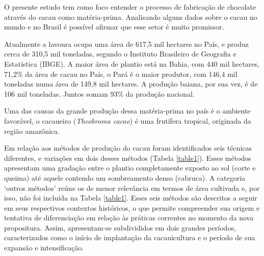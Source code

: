 \documentclass[
	12pt,				%
	openright,			%
	oneside,			%
	a4paper,			%
	english,			%
	french,				%
	spanish,			%
	brazil				%
	]{abntex2}
\begin{document}
O presente estudo tem como foco entender o processo de fabricação de chocolate através do cacau como matéria-prima. Analisando alguns dados sobre o cacau no mundo e no Brasil é possível afirmar que esse setor é muito promissor.

Atualmente a lavoura ocupa uma área de 617,5 mil hectares no País, e produz cerca de 310,5 mil toneladas, segundo o Instituto Brasileiro de Geografia e Estatística (IBGE). A maior área de plantio está na Bahia, com 440 mil hectares, 71,2$\%$ da área de cacau no País, o Pará é o maior produtor, com 146,4 mil toneladas numa área de 149,8 mil hectares. A produção baiana, por sua vez, é de 106 mil toneladas. Juntos somam 93$\%$ da produção nacional. \cite{6}

Uma das causas da grande produção dessa matéria-prima no país é o ambiente favorável, o cacaueiro (\textit{Theobroma cacao}) é uma frutífera tropical, originada da região amazônica.

Em relação aos métodos de produção do cacau foram identificados seis técnicas diferentes, e variações em dois desses métodos (Tabela \ref{table1}). Esses métodos apresentam uma gradação entre o plantio completamente exposto ao sol (corte e queima) até aquele contendo um sombreamento denso (cabruca). A categoria ‘outros métodos’ reúne os de menor relevância em termos de área cultivada e, por isso, não foi incluída na Tabela \ref{table1}. Esses seis métodos são descritos a seguir em seus respectivos contextos históricos, o que permite compreender sua origem e tentativa de diferenciação em relação às práticas correntes no momento da nova propositura. Assim, apresentam-se subdivididos em dois grandes períodos, caracterizados como o início de implantação da cacauicultura e o período de sua expansão e intensificação. \cite{10}
\end{document}

